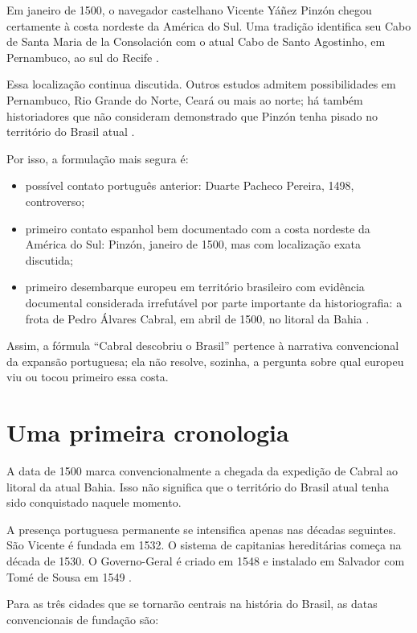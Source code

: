 Em janeiro de 1500, o navegador castelhano
Vicente Yáñez Pinzón chegou certamente à
costa nordeste da América do Sul. Uma
tradição identifica seu Cabo de Santa Maria
de la Consolación com o atual Cabo de Santo
Agostinho, em Pernambuco, ao sul do Recife
\cite{amazon-first-contact,cabo-pinzon}.

Essa localização continua discutida.
Outros estudos admitem possibilidades em
Pernambuco, Rio Grande do Norte, Ceará ou
mais ao norte; há também historiadores que
não consideram demonstrado que Pinzón tenha
pisado no território do Brasil atual
\cite{funag-pinzon,disney-brazil}.

Por isso, a formulação mais segura é:
\begin{itemize}
\item possível contato português anterior:
Duarte Pacheco Pereira, 1498, controverso;
\item primeiro contato espanhol bem
documentado com a costa nordeste da América
do Sul: Pinzón, janeiro de 1500, mas com
localização exata discutida;
\item primeiro desembarque europeu em
território brasileiro com evidência
documental considerada irrefutável por
parte importante da historiografia: a frota
de Pedro Álvares Cabral, em abril de 1500,
no litoral da Bahia \cite{disney-brazil}.
\end{itemize}

Assim, a fórmula ``Cabral descobriu o
Brasil'' pertence à narrativa convencional
da expansão portuguesa; ela não resolve,
sozinha, a pergunta sobre qual europeu viu
ou tocou primeiro essa costa.

\section{Uma primeira cronologia}
\label{section-primeira-cronologia-brasil}

A data de 1500 marca convencionalmente a
chegada da expedição de Cabral ao litoral
da atual Bahia. Isso não significa que o
território do Brasil atual tenha sido
conquistado naquele momento.

A presença portuguesa permanente se
intensifica apenas nas décadas seguintes.
São Vicente é fundada em 1532. O sistema de
capitanias hereditárias começa na década de
1530. O Governo-Geral é criado em 1548 e
instalado em Salvador com Tomé de Sousa em
1549 \cite{arquivo-nacional-tome}.

Para as três cidades que se tornarão
centrais na história do Brasil, as datas
convencionais de fundação são:

